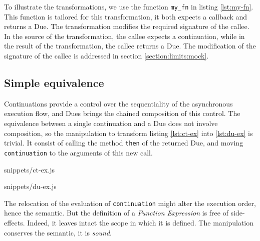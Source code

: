 To illustrate the transformations, we use the function \texttt{my_fn} in listing \ref{lst:my-fn}.
This function is tailored for this transformation, it both expects a callback and returns a Due.
The transformation modifies the required signature of the callee.
In the source of the transformation, the callee expects a continuation, while in the result of the transformation, the callee returns a Due.
The modification of the signature of the callee is addressed in section \ref{section:limits:mock}.



\subsection{Simple equivalence} \label{section:equivalence:simple}


Continuations provide a control over the sequentiality of the asynchronous execution flow, and Dues brings the chained composition of this control.
The equivalence between a single continuation and a Due does not involve composition, so the manipulation to transform listing \ref{lst:ct-ex} into \ref{lst:du-ex} is trivial.
It consist of calling the method \texttt{then} of the returned Due, and moving \texttt{continuation} to the arguments of this new call.

             {snippets/ct-ex.js}

             {snippets/du-ex.js}

The relocation of the evaluation of \texttt{continuation} might alter the execution order, hence the semantic.
But the definition of a \textit{Function Expression} is free of side-effects.
Indeed, it leaves intact the scope in which it is defined.
The manipulation conserves the semantic, it is \textit{sound}.

